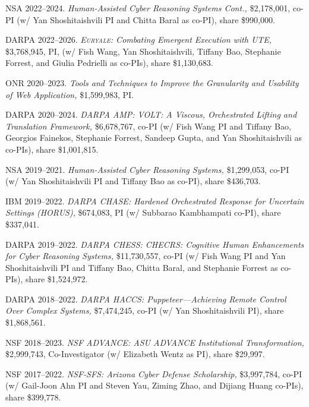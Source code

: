 \documentclass[11pt,letterpaper,sans]{moderncv}
\begin{document}
\begin{etaremune}
\item NSA 2022--2024. \textit{Human-Assisted Cyber Reasoning Systems Cont.,} \$2,178,001, co-PI (w/ Yan Shoshitaishvili PI and Chitta Baral as co-PI), share \$990,000.
  
\item DARPA 2022--2026. \textit{\textsc{Euryale}: Combating Emergent Execution with UTE,} \$3,768,945, PI, (w/ Fish Wang, Yan Shoshitaishvili, Tiffany Bao, Stephanie Forrest, and Giulia Pedrielli as co-PIs), share \$1,130,683.

\item ONR 2020--2023. \textit{Tools and Techniques to Improve the Granularity and Usability of Web Application,} \$1,599,983, PI.

  \item DARPA 2020--2024. \textit{DARPA AMP: VOLT: A Viscous, Orchestrated Lifting and Translation Framework,} \$6,678,767, co-PI (w/ Fish Wang PI and Tiffany Bao, Georgios Fainekos, Stephanie Forrest, Sandeep Gupta, and Yan Shoshitaishvili as co-PIs), share \$1,001,815.

  \item NSA 2019--2021. \textit{Human-Assisted Cyber Reasoning Systems,} \$1,299,053, co-PI (w/ Yan Shoshitaishvili PI and Tiffany Bao as co-PI), share \$436,703.

  \item IBM 2019--2022. \textit{DARPA CHASE: Hardened Orchestrated Response for Uncertain Settings (HORUS),} \$674,083, PI (w/ Subbarao Kambhampati co-PI), share \$337,041.

  \item DARPA 2019--2022. \textit{DARPA CHESS: CHECRS: Cognitive Human Enhancements for Cyber Reasoning Systems,} \$11,730,557, co-PI (w/ Fish Wang PI and Yan Shoshitaishvili PI and Tiffany Bao, Chitta Baral, and Stephanie Forrest as co-PIs), share \$1,524,972.

  \item DARPA 2018--2022. \textit{DARPA HACCS: Puppeteer---Achieving Remote Control Over Complex Systems,} \$7,474,245, co-PI (w/ Yan Shoshitaishvili PI), share \$1,868,561.

  \item NSF 2018--2023. \textit{NSF ADVANCE: ASU ADVANCE Institutional Transformation,} \$2,999,743, Co-Investigator (w/ Elizabeth Wentz as PI), share \$29,997.

  \item NSF 2017--2022. \textit{NSF-SFS: Arizona Cyber Defense
    Scholarship,} \$3,997,784, co-PI (w/ Gail-Joon Ahn PI and Steven
    Yau, Ziming Zhao, and Dijiang Huang co-PIs), share \$399,778.


\end{etaremune}
\end{document}
